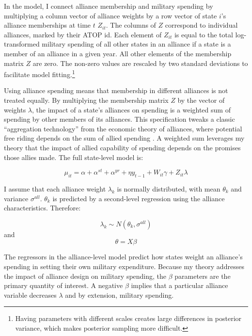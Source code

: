 \documentclass[12pt]{article}
\begin{document}
In the model, I connect alliance membership and military spending by multiplying a column vector of alliance weights by a row vector of state $i$'s alliance memberships at time $t$ $Z_{it}$. The columns of $Z$ correspond to individual alliances, marked by their ATOP id. Each element of $Z_{it}$ is equal to the total log-transformed military spending of all other states in an alliance if a state is a member of an alliance in a given year. All other elements of the membership matrix $Z$ are zero. The non-zero values are rescaled by two standard deviations to facilitate model fitting.\footnote{Having parameters with different scales creates large differences in posterior variance, which makes posterior sampling more difficult.} 

Using alliance spending means that membership in different alliances is not treated equally. By multiplying the membership matrix $Z$ by the vector of weights $\lambda$, the impact of a state's alliances on spending is a weighted sum of spending by other members of its alliances. This specification tweaks a classic ``aggregation technology'' from the economic theory of alliances, where potential free riding depends on the sum of allied spending \citep{Murdoch1995}. A weighted sum leverages my theory that the impact of allied capability of spending depends on the promises those allies made. The full state-level model is:

\begin{equation}
\mu_{it} = \alpha + \alpha^{st} + \alpha^{yr} + \eta y_{t-1} + W_{it} \gamma + Z_{it} \lambda 
\end{equation}

I assume that each alliance weight $\lambda_k$ is normally distributed, with mean $\theta_k$ and variance $\sigma^{all}$. $\theta_k$ is predicted by a second-level regression using the alliance characteristics. Therefore:

\begin{equation}
\lambda_k \sim N(\theta_k , \sigma^{all})
\end{equation} 
and 
\begin{equation}
\theta = X \beta
\end{equation}

The regressors in the alliance-level model predict how states weight an alliance's spending in setting their own military expenditure. Because my theory addresses the impact of alliance design on military spending, the $\beta$ parameters are the primary quantity of interest. A negative $\beta$ implies that a particular alliance variable decreases $\lambda$ and by extension, military spending.
\end{document}
